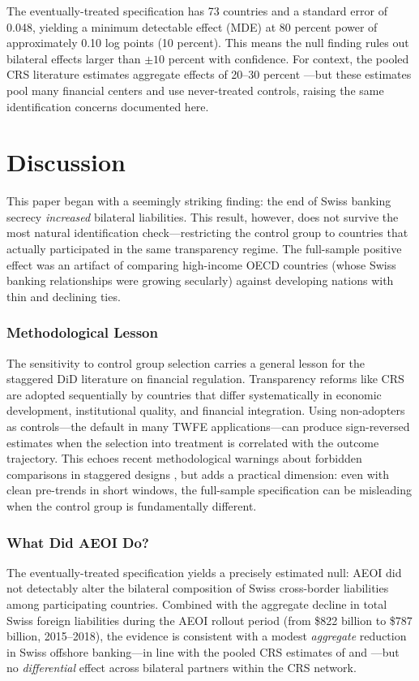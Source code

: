 \documentclass[12pt]{article}
\begin{document}
The eventually-treated specification has 73 countries and a standard error of 0.048, yielding a minimum detectable effect (MDE) at 80 percent power of approximately 0.10 log points (10 percent). This means the null finding rules out bilateral effects larger than $\pm 10$ percent with confidence. For context, the pooled CRS literature estimates aggregate effects of 20--30 percent \citep{casi2020cross}---but these estimates pool many financial centers and use never-treated controls, raising the same identification concerns documented here.

\section{Discussion}

This paper began with a seemingly striking finding: the end of Swiss banking secrecy \textit{increased} bilateral liabilities. This result, however, does not survive the most natural identification check---restricting the control group to countries that actually participated in the same transparency regime. The full-sample positive effect was an artifact of comparing high-income OECD countries (whose Swiss banking relationships were growing secularly) against developing nations with thin and declining ties.

\subsubsection*{Methodological Lesson} The sensitivity to control group selection carries a general lesson for the staggered DiD literature on financial regulation. Transparency reforms like CRS are adopted sequentially by countries that differ systematically in economic development, institutional quality, and financial integration. Using non-adopters as controls---the default in many TWFE applications---can produce sign-reversed estimates when the selection into treatment is correlated with the outcome trajectory. This echoes recent methodological warnings about forbidden comparisons in staggered designs \citep{goodman2021difference, de2020two}, but adds a practical dimension: even with clean pre-trends in short windows, the full-sample specification can be misleading when the control group is fundamentally different.

\subsubsection*{What Did AEOI Do?} The eventually-treated specification yields a precisely estimated null: AEOI did not detectably alter the bilateral composition of Swiss cross-border liabilities among participating countries. Combined with the aggregate decline in total Swiss foreign liabilities during the AEOI rollout period (from \$822 billion to \$787 billion, 2015--2018), the evidence is consistent with a modest \textit{aggregate} reduction in Swiss offshore banking---in line with the pooled CRS estimates of \citet{casi2020cross} and \citet{johannesen2014end}---but no \textit{differential} effect across bilateral partners within the CRS network.
\end{document}
